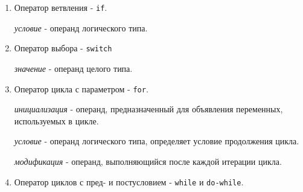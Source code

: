 \begin{enumerate}
\def\labelenumi{\arabic{enumi})}
\item
  Оператор ветвления - \texttt{if}.

\begin{Shaded}
\begin{Highlighting}[]
 \OperatorTok{(}\OperatorTok{)} \OperatorTok{\{}  \OperatorTok{\}}
\end{Highlighting}
\end{Shaded}

  \emph{условие} - операнд логического типа.
\item
  Оператор выбора - \texttt{switch}

\begin{Shaded}
\begin{Highlighting}[]
 \OperatorTok{(}\OperatorTok{)} \OperatorTok{\{}
  \OperatorTok{\_:}
    \OperatorTok{;}
  \OperatorTok{\_:}
    \OperatorTok{;}
  \OperatorTok{:}
    \OperatorTok{;}
\OperatorTok{\}}
\end{Highlighting}
\end{Shaded}

  \emph{значение} - операнд целого типа.
\item
  Оператор цикла с параметром - \texttt{for}.

\begin{Shaded}
\begin{Highlighting}[]
 \OperatorTok{(}\OperatorTok{;}\OperatorTok{;}\OperatorTok{)} \OperatorTok{\{}  \OperatorTok{\}}
\end{Highlighting}
\end{Shaded}

  \emph{инициализация} - операнд, предназначенный для объявления
  переменных, используемых в цикле.

  \emph{условие} - операнд логического типа, определяет условие
  продолжения цикла.

  \emph{модификация} - операнд, выполняющийся после каждой итерации
  цикла.
\item
  Оператор циклов с пред- и постусловием - \texttt{while} и
  \texttt{do-while}.


\end{enumerate}
